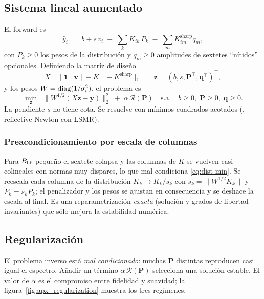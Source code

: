 \subsection{Sistema lineal aumentado}\label{sec:dist-system}

El forward es
\begin{equation}
  \hat y_i \;=\; b + s\,v_i \;-\; \sum_{k}K_{ik}\,P_k \;-\;\sum_{m}K^{\text{sharp}}_{im}q_m,
\end{equation}
con $P_k\ge0$ los pesos de la distribución y $q_m\ge0$ amplitudes de sextetes
``nítidos'' opcionales. Definiendo la matriz de diseño
\begin{equation}
  X = \bigl[\;\bm 1\;\big|\;\bm v\;\big|\;{-}K\;\big|\;{-}K^{\text{sharp}}\;\bigr],
  \qquad \bm z=(b,s,\bm P^\top,\bm q^\top)^\top,
\end{equation}
y los pesos $W=\operatorname{diag}(1/\sigma_i^2)$, el problema es
\begin{equation}
  \boxed{\;
  \min_{\bm z}\;\;\bigl\|W^{1/2}(X\bm z-\bm y)\bigr\|_2^2 \;+\; \alpha\,\mathcal R(\bm P)
  \quad\text{s.a.}\quad b\ge0,\;\bm P\ge0,\;\bm q\ge0.\;}
  \label{eq:dist-min}
\end{equation}
La pendiente $s$ no tiene cota. Se resuelve con mínimos cuadrados acotados
(, reflective Newton con LSMR).

\subsubsection{Preacondicionamiento por escala de columnas}\label{sec:cond}
Para $B_{\mathrm{hf}}$ pequeño el sextete colapsa y las columnas de $K$ se vuelven casi
colineales con normas muy dispares, lo que mal-condiciona \eqref{eq:dist-min}.
Se reescala cada columna de la distribución $K_k\to K_k/s_k$ con
$s_k=\lVert W^{1/2}K_k\rVert$ y $\tilde P_k=s_k P_k$; el penalizador y los pesos
se ajustan en consecuencia y se deshace la escala al final. Es una
reparametrización \emph{exacta} (solución y grados de libertad invariantes) que
sólo mejora la estabilidad numérica.

\subsection{Regularización}\label{sec:reg}

El problema inverso está \emph{mal condicionado}: muchas $\bm P$ distintas
reproducen casi igual el espectro. Añadir un término $\alpha\,\mathcal R(\bm P)$
selecciona una solución estable. El valor de $\alpha$ es el compromiso entre
fidelidad y suavidad; la figura~\ref{fig:apx_regularization} muestra los tres
regímenes.

